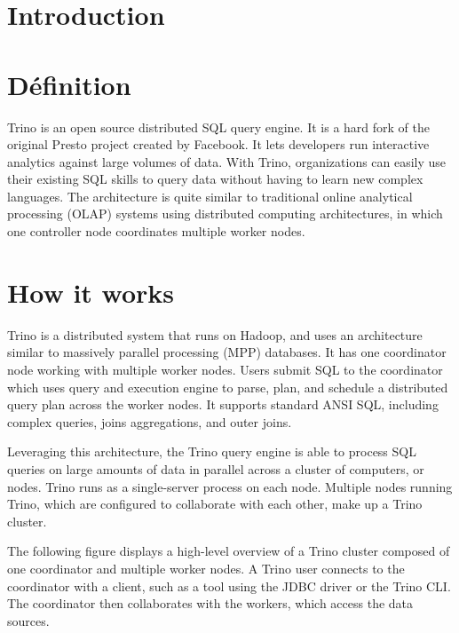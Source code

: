 
\section*{Introduction}

\section{Définition}
Trino is an open source distributed SQL query engine. It is a hard fork of the original Presto project created by Facebook. It lets developers run interactive analytics against large volumes of data. With Trino, organizations can easily use their existing SQL skills to query data without having to learn new complex languages. The architecture is quite similar to traditional online analytical processing (OLAP) systems using distributed computing architectures, in which one controller node coordinates multiple worker nodes.

\section{How it works}
Trino is a distributed system that runs on Hadoop, and uses an architecture similar to massively parallel processing (MPP) databases. It has one coordinator node working with multiple worker nodes. Users submit SQL to the coordinator which uses query and execution engine to parse, plan, and schedule a distributed query plan across the worker nodes. It supports standard ANSI SQL, including complex queries, joins aggregations, and outer joins.

Leveraging this architecture, the Trino query engine is able to process SQL queries on large amounts of data in parallel across a cluster of computers, or nodes. Trino runs as a single-server process on each node. Multiple nodes running Trino, which are configured to collaborate with each other, make up a Trino cluster.

The following figure displays a high-level overview of a Trino cluster composed of one coordinator and multiple worker nodes. A Trino user connects to the coordinator with a client, such as a tool using the JDBC driver or the Trino CLI. The coordinator then collaborates with the workers, which access the data sources.


